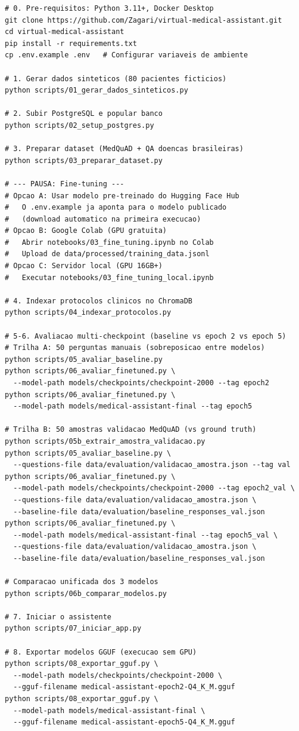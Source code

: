 \begin{lstlisting}[style=bash, caption={Comandos para reprodução completa do projeto.}]
# 0. Pre-requisitos: Python 3.11+, Docker Desktop
git clone https://github.com/Zagari/virtual-medical-assistant.git
cd virtual-medical-assistant
pip install -r requirements.txt
cp .env.example .env   # Configurar variaveis de ambiente

# 1. Gerar dados sinteticos (80 pacientes ficticios)
python scripts/01_gerar_dados_sinteticos.py

# 2. Subir PostgreSQL e popular banco
python scripts/02_setup_postgres.py

# 3. Preparar dataset (MedQuAD + QA doencas brasileiras)
python scripts/03_preparar_dataset.py

# --- PAUSA: Fine-tuning ---
# Opcao A: Usar modelo pre-treinado do Hugging Face Hub
#   O .env.example ja aponta para o modelo publicado
#   (download automatico na primeira execucao)
# Opcao B: Google Colab (GPU gratuita)
#   Abrir notebooks/03_fine_tuning.ipynb no Colab
#   Upload de data/processed/training_data.jsonl
# Opcao C: Servidor local (GPU 16GB+)
#   Executar notebooks/03_fine_tuning_local.ipynb

# 4. Indexar protocolos clinicos no ChromaDB
python scripts/04_indexar_protocolos.py

# 5-6. Avaliacao multi-checkpoint (baseline vs epoch 2 vs epoch 5)
# Trilha A: 50 perguntas manuais (sobreposicao entre modelos)
python scripts/05_avaliar_baseline.py
python scripts/06_avaliar_finetuned.py \
  --model-path models/checkpoints/checkpoint-2000 --tag epoch2
python scripts/06_avaliar_finetuned.py \
  --model-path models/medical-assistant-final --tag epoch5

# Trilha B: 50 amostras validacao MedQuAD (vs ground truth)
python scripts/05b_extrair_amostra_validacao.py
python scripts/05_avaliar_baseline.py \
  --questions-file data/evaluation/validacao_amostra.json --tag val
python scripts/06_avaliar_finetuned.py \
  --model-path models/checkpoints/checkpoint-2000 --tag epoch2_val \
  --questions-file data/evaluation/validacao_amostra.json \
  --baseline-file data/evaluation/baseline_responses_val.json
python scripts/06_avaliar_finetuned.py \
  --model-path models/medical-assistant-final --tag epoch5_val \
  --questions-file data/evaluation/validacao_amostra.json \
  --baseline-file data/evaluation/baseline_responses_val.json

# Comparacao unificada dos 3 modelos
python scripts/06b_comparar_modelos.py

# 7. Iniciar o assistente
python scripts/07_iniciar_app.py

# 8. Exportar modelos GGUF (execucao sem GPU)
python scripts/08_exportar_gguf.py \
  --model-path models/checkpoints/checkpoint-2000 \
  --gguf-filename medical-assistant-epoch2-Q4_K_M.gguf
python scripts/08_exportar_gguf.py \
  --model-path models/medical-assistant-final \
  --gguf-filename medical-assistant-epoch5-Q4_K_M.gguf
\end{lstlisting}

